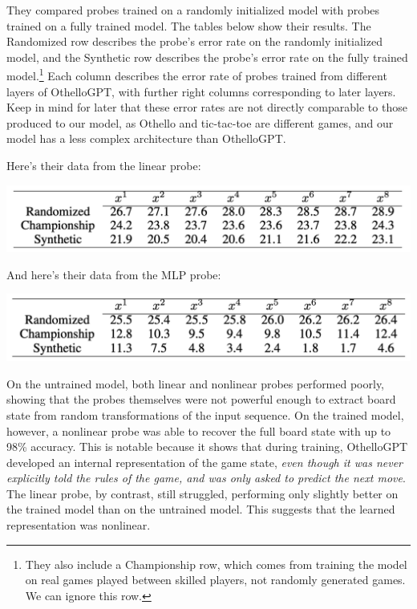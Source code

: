\documentclass[11pt]{article}
\begin{document}
They compared probes trained on a randomly initialized model with probes
trained on a fully trained model. The tables below show their results.
The Randomized row describes the probe's error rate on the randomly
initialized model, and the Synthetic row describes the probe's error
rate on the fully trained model.\footnote{They also include a Championship row, which comes from
training the model on real games played between skilled players, not
randomly generated games. We can ignore this row.} Each column describes the
error rate of probes trained from different layers of OthelloGPT, with
further right columns corresponding to later layers. Keep in mind for
later that these error rates are not directly comparable to those
produced to our model, as Othello and tic-tac-toe are different games,
and our model has a less complex architecture than OthelloGPT.

Here's their data from the linear probe:

\begin{center}
\includegraphics[keepaspectratio]{inserted_images/othello_linear.png}
\end{center}

And here's their data from the MLP probe:

\begin{center}
\includegraphics[keepaspectratio]{inserted_images/othello_mlp.png}
\end{center}

On the untrained model, both linear and nonlinear probes performed
poorly, showing that the probes themselves were not powerful enough to
extract board state from random transformations of the input sequence.
On the trained model, however, a nonlinear probe was able to recover the
full board state with up to 98\% accuracy. This is notable because it
shows that during training, OthelloGPT developed an internal
representation of the game state, \emph{even though it was never
explicitly told the rules of the game, and was only asked to predict the
next move}. The linear probe, by contrast, still struggled, performing
only slightly better on the trained model than on the untrained model.
This suggests that the learned representation was nonlinear.
\end{document}
